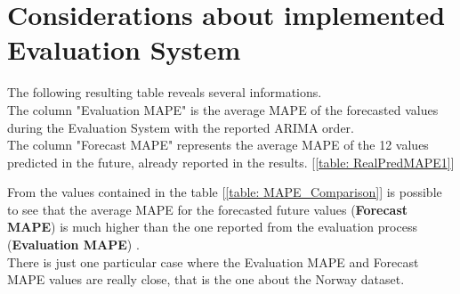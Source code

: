 \section{Considerations about implemented Evaluation System }
\label{Discussion1}
The following resulting table reveals several informations. \\
The column "Evaluation MAPE" is the average MAPE of the forecasted values during the Evaluation System with the reported ARIMA order. \\ 
The column "Forecast MAPE" represents the average MAPE of the 12 values predicted in the future, already reported in the results. [\ref{table: RealPredMAPE1}] 

 \begin{table}[ht]
         \caption{Comparison between Evaluation MAPE and Prediction MAPE}   
   \label{table: MAPE_Comparison} 
\end{table}        

From the values contained in the table [\ref{table: MAPE_Comparison}] is possible to see that the average MAPE for the forecasted future values (\textbf{Forecast MAPE}) is much higher than the one reported from the evaluation process (\textbf{Evaluation MAPE}) . \\
There is just one particular case where the Evaluation MAPE and Forecast MAPE values are really close, that is the one about the Norway dataset.

